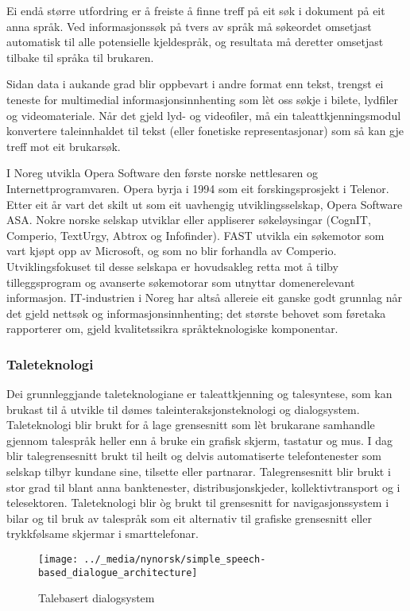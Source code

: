 \begin{multicols}{2}
Ei endå større utfordring er å freiste å finne treff på eit søk i dokument på eit anna språk. Ved informasjonssøk på tvers av språk må søkeordet omsetjast automatisk til alle potensielle kjeldespråk, og resultata må deretter omsetjast tilbake til språka til brukaren. 

Sidan data i aukande grad blir oppbevart i andre format enn tekst, trengst ei teneste for multimedial informasjonsinnhenting som lèt oss søkje i bilete, lydfiler og videomateriale. Når det gjeld lyd- og videofiler, må ein taleattkjenningsmodul konvertere taleinnhaldet til tekst (eller fonetiske representasjonar) som så kan gje treff mot eit brukarsøk. 

I Noreg utvikla Opera Software den første norske nettlesaren og Internettprogramvaren. Opera byrja i 1994 som eit forskingsprosjekt i Telenor. 
Etter eit år vart det skilt ut som eit uavhengig utviklingsselskap, Opera Software ASA. Nokre norske selskap utviklar eller appliserer søkeløysingar (CognIT, Comperio, TextUrgy, Abtrox og Infofinder). 
FAST utvikla ein søkemotor som vart kjøpt opp av Microsoft, og som no blir forhandla av Comperio. 
Utviklingsfokuset til desse selskapa er hovudsakleg retta mot å tilby tilleggsprogram og avanserte søkemotorar som utnyttar domenerelevant informasjon. 
IT-industrien i Noreg har altså allereie eit ganske godt grunnlag når det gjeld nettsøk og informasjonsinnhenting; det største behovet som føretaka rapporterer om, gjeld kvalitetssikra språkteknologiske komponentar.

\subsubsection{Taleteknologi}

Dei grunnleggjande taleteknologiane er taleattkjenning og talesyntese, som kan brukast til å utvikle til dømes taleinteraksjonsteknologi og dialogsystem. Taleteknologi blir brukt for å lage grensesnitt som lèt brukarane samhandle gjennom talespråk heller enn å bruke ein grafisk skjerm, tastatur og mus. I dag blir talegrensesnitt brukt til heilt og delvis automatiserte telefontenester som selskap tilbyr kundane sine, tilsette eller partnarar. Talegrensesnitt blir brukt i stor grad til blant anna banktenester, distribusjonskjeder, kollektivtransport og i telesektoren. Taleteknologi blir òg brukt til grensesnitt for navigasjonssystem i bilar og til bruk av talespråk som eit alternativ til grafiske grensesnitt eller trykkfølsame skjermar i smarttelefonar. 

\begin{figure*}[htb]
  \center
  \texttt{[image: ../\_media/nynorsk/simple\_speech-based\_dialogue\_architecture]}
  \caption{Talebasert dialogsystem}
  \label{fig:dialoguearch_no}
\end{figure*}


\end{multicols}
